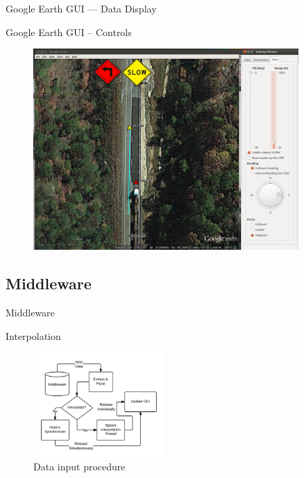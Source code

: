 \documentclass{beamer}
\begin{document}
    \begin{frame}{Google Earth GUI --- Data Display}
    \end{frame}

    \begin{frame}{Google Earth GUI -- Controls}
      \begin{figure}
        \includegraphics[width=0.9\textwidth]{../graphics/earth_slow.png}
      \end{figure}
    \end{frame}

  \subsection{Middleware}

    \begin{frame}{Middleware}
    \end{frame}

    \begin{frame}{Interpolation}
      \begin{figure}[ht] \centering
        \includegraphics[width=5cm] {../graphics/middleware_diagram.png}
        \caption{Data input procedure} \label{fig:mw_diagram}
      \end{figure}
    \end{frame}
\end{document}
